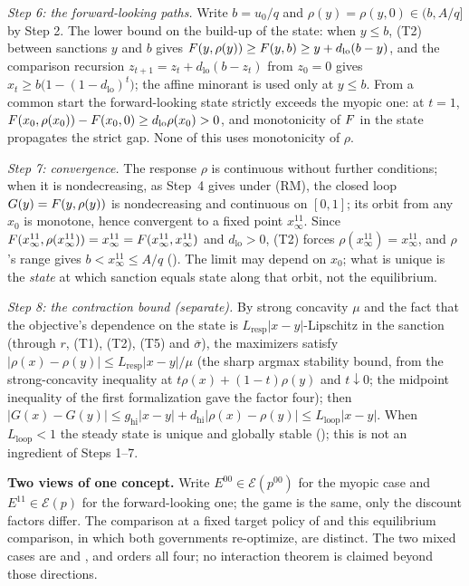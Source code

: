 \emph{Step 6: the forward-looking paths.} Write $b=u_0/q$ and
$\rho(y)=\rho(y,0)\in(b,A/q]$ by Step 2. The lower bound on the build-up of the state: when $y\le b$, (T2)
between sanctions $y$ and $b$ gives $F(y,\rho(y))\ge F(y,b)\ge y+d_{\mathrm{lo}}(b-y)$,
and the comparison recursion $z_{t+1}=z_t+d_{\mathrm{lo}}(b-z_t)$ from $z_0=0$
gives $x_t\ge b\bigl(1-(1-d_{\mathrm{lo}})^t\bigr)$; the affine minorant is
used only at $y\le b$. From a common start the forward-looking state strictly
exceeds the myopic one: at $t=1$,
$F(x_0,\rho(x_0))-F(x_0,0)\ge d_{\mathrm{lo}}\rho(x_0)>0$, and
monotonicity of $F$ in the state propagates the strict gap. None of this
uses monotonicity of $\rho$.

\emph{Step 7: convergence.} The response $\rho$ is continuous without further conditions;
when it is nondecreasing, as Step~4 gives under (RM), the closed loop
$G(y)=F(y,\rho(y))$ is nondecreasing and continuous on $[0,1]$; its orbit from any $x_0$ is monotone, hence
convergent to a fixed point $x^{11}_\infty$. Since $F(x^{11}_\infty,\rho(x^{11}_\infty))=x^{11}_\infty=F(x^{11}_\infty,x^{11}_\infty)$ and
$d_{\mathrm{lo}}>0$, (T2) forces $\rho(x^{11}_\infty)=x^{11}_\infty$, and $\rho$'s range gives
$b<x^{11}_\infty\le A/q$ (). The limit
may depend on $x_0$; what is unique is the
\emph{state} at which sanction equals state along that orbit, not the
equilibrium.

\emph{Step 8: the contraction bound (separate).} By strong concavity
$\mu$ and the fact that the objective's dependence on the state is
$L_{\mathrm{resp}}|x-y|$-Lipschitz in the sanction (through $r$, (T1), (T2),
(T5) and $\bar\sigma$), the maximizers satisfy
$|\rho(x)-\rho(y)|\le L_{\mathrm{resp}}|x-y|/\mu$ (the sharp argmax
stability bound, from the strong-concavity inequality at $t\rho(x)+(1-t)\rho(y)$ and $t\downarrow0$;
the midpoint inequality of the first formalization gave the factor four); then
$|G(x)-G(y)|\le g_{\mathrm{hi}}|x-y|+d_{\mathrm{hi}}|\rho(x)-\rho(y)|
\le L_{\mathrm{loop}}|x-y|$. When $L_{\mathrm{loop}}<1$ the steady state is
unique and globally stable (); this
is not an ingredient of Steps 1--7.

\textbf{Two views of one concept.} Write $E^{00}\in\mathcal E(p^{00})$ for
the myopic case and $E^{11}\in\mathcal E(p)$ for the forward-looking one;
the game is the same, only the discount factors differ. The
comparison at a fixed target policy of  and
this equilibrium comparison, in which both governments re-optimize, are distinct. The two mixed cases are
 and , and
 orders all four; no interaction theorem is claimed
beyond those directions.

